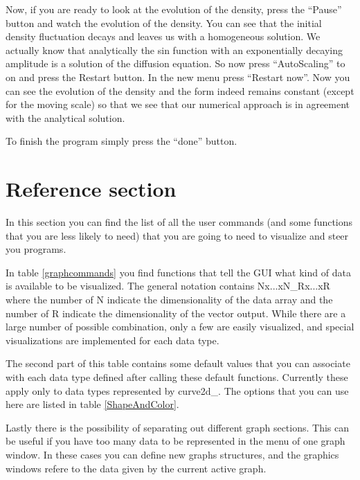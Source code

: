 \documentclass[12pt,letterpaper]{article}
\begin{document}
Now, if you are ready to look at the evolution of the density, press
the ``Pause'' button and watch the evolution of the density. You can
see that the initial density fluctuation decays and leaves us with a
homogeneous solution. We actually know that analytically the sin
function with an exponentially decaying amplitude is a solution of the
diffusion equation. So now press ``AutoScaling'' to on and
press the Restart button. In the new menu press ``Restart now''. Now
you can see the evolution of the density and the form indeed remains
constant (except for the moving scale) so that we see that our
numerical approach is in agreement with the analytical solution.

To finish the program simply press the ``done'' button.

\section{Reference section}
\label{graphs}
In this section you can find the list of all the user commands (and
some functions that you are less likely to need) that you are going to
need to visualize and steer you programs. 

In table \ref{graphcommands} you find functions that tell the GUI what kind of data is available to be visualized. The general notation contains Nx...xN\_Rx...xR where the number of N indicate the dimensionality of the data array and the number of R indicate the dimensionality of the vector output. While there are a large number of possible combination, only a few are easily visualized, and special visualizations are implemented for each data type.

The second part of this table contains some default values that you can associate with each data type defined after calling these default functions. Currently these apply only to data types represented by curve2d\_. The options that you can use here are listed in table \ref{ShapeAndColor}.

Lastly there is the possibility of separating out different graph sections. This can be useful if you have too many data to be represented in the menu of one graph window. In these cases you can define new graphs structures, and the graphics windows refere to the data given by the current active graph. 

\end{document}
